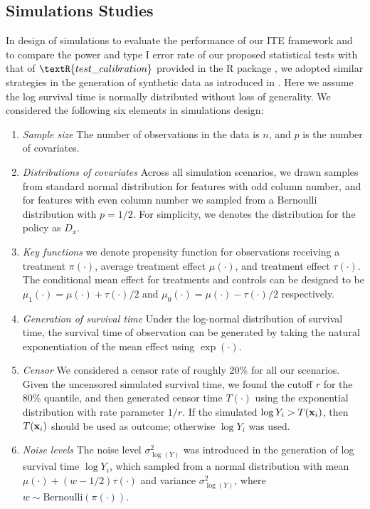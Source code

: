   \subsection{Simulations Studies}
    In design of simulations to evaluate the performance of our ITE framework and to compare the power and type I error rate of our proposed statistical tests with that of $\textR{test\_calibration}$ provided in the R package , we adopted similar strategies in the generation of synthetic data as introduced in \cite{powers2017some}. Here we assume the log survival time is normally distributed without loss of generality. We considered the following six elements in simulations design:
    \begin{enumerate}
      \item \textit{Sample size} The number of observations in the data is $n$, and $p$ is the number of covariates.
      \item \textit{Distributions of covariates} Across all simulation scenarios, we drawn samples from standard normal distribution for features with odd column number, and for features with even column number we sampled from a Bernoulli distribution with $p = 1/2$. For simplicity, we denotes the distribution for the policy as $D_x$.
      \item \textit{Key functions} we denote propensity function for observations receiving a treatment $\pi(\cdot)$, average treatment effect $\mu(\cdot)$, and treatment effect $\tau(\cdot)$. The conditional mean effect for treatments and controls can be designed to be $\mu_1(\cdot) = \mu(\cdot) + \tau(\cdot)/2 $ and $\mu_0(\cdot) = \mu(\cdot) - \tau(\cdot)/2 $ respectively.
      \item \textit{Generation of survival time} Under the log-normal distribution of survival time, the survival time of observation can be generated by taking the natural exponentiation of the mean effect using $\exp(\cdot)$.
      \item \textit{Censor} We considered a censor rate of roughly 20\% for all our scenarios. Given the uncensored simulated survival time, we found the cutoff $r$ for the 80\% quantile, and then generated censor time $T(\cdot)$ using the exponential distribution with rate parameter $1/r$. If the simulated $\log Y_i > T(\mathbf{x}_i)$, then $T(\mathbf{x}_i)$ should be used as outcome; otherwise $\log Y_i$ was used.
      \item \textit{Noise levels} The noise level $\sigma_{\log(Y)}^2$ was introduced in the generation of log survival time $\log Y_i$, which sampled from a normal distribution with mean $\mu(\cdot) + (w - 1/2) \tau(\cdot)$ and variance $\sigma_{\log(Y)}^2$, where $w \sim \mathrm{Bernoulli}(\pi(\cdot))$. 
    \end{enumerate}  
